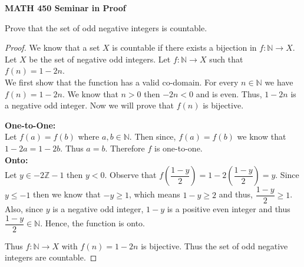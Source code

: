 \documentclass[14pt]{article}
\newcommand{\Z}{\mathbb Z}
\newcommand{\N}{\mathbb N}
\begin{document}
\begin{center}
		
{\bf MATH 450 Seminar in Proof}
 \\
\end{center}
	Prove that the set of odd negative integers is countable.\\
\begin{proof}
	 We know that a set $X$ is countable if there exists a bijection in $f: \N \rightarrow X$. Let $X$ be the set of negative odd integers.
	 Let $f:\N \rightarrow X $ such that $f(n) = 1-2n$. \\
We first show that the function has a valid co-domain. For every $n \in \N$ we have $f(n) = 1- 2n$. We know that $n >0$ then $-2n < 0$ and is even. Thus, $1-2n$ is a negative odd integer. Now we will prove that $f(n)$ is bijective.

\textbf{One-to-One: \\}
Let $f(a) = f(b)$ where $a,b \in \N$. Then since, $f(a)= f(b)$ we know that $1-2a = 1-2b$. Thus $a=b$. Therefore $f$ is one-to-one.\\
\textbf{Onto: \\}
Let $y \in -2\Z -1$ then $y < 0$. Observe that $f\left(\dfrac{1-y}{2}\right) = 1-2\left(\dfrac{1-y}{2}\right)= y$. Since $y \leq -1$ then we know that $-y \geq 1$, which means $ 1- y \geq 2$ and thus, $\dfrac{1-y}{2} \geq 1$. Also, since $y$ is a negative odd integer, $1-y$ is a positive even integer and thus $\dfrac{1-y}{2} \in \N$. Hence, the function is onto.

Thus $f:\N \rightarrow X$ with $f(n) = 1-2n$ is bijective. Thus the set of odd negative integers are countable.
\end{proof}
\end{document}
